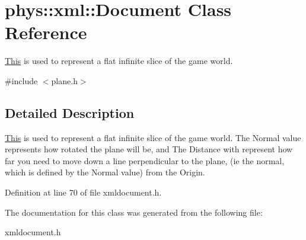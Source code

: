 \hypertarget{classphys_1_1xml_1_1Document}{
\section{phys::xml::Document Class Reference}
\label{dd/d44/classphys_1_1xml_1_1Document}
}


\hyperlink{structThis}{This} is used to represent a flat infinite slice of the game world.  




{\ttfamily \#include $<$plane.h$>$}



\subsection{Detailed Description}
\hyperlink{structThis}{This} is used to represent a flat infinite slice of the game world. The Normal value represents how rotated the plane will be, and The Distance with represent how far you need to move down a line perpendicular to the plane, (ie the normal, which is defined by the Normal value) from the Origin. 

Definition at line 70 of file xmldocument.h.



The documentation for this class was generated from the following file:\begin{DoxyCompactItemize}
\item 
xmldocument.h\end{DoxyCompactItemize}
